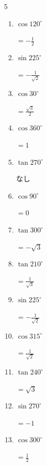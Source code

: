\begin{multicols}{5}
\begin{enumerate}
        $\displaystyle =0$

  \item $\displaystyle \cos{120^\circ}$

        $\displaystyle =-\frac{1}{2}$

  \item $\displaystyle \sin{225^\circ}$

        $\displaystyle =-\frac{1}{\sqrt{2}}$

  \item $\displaystyle \cos{30^\circ}$

        $\displaystyle =\frac{\sqrt{3}}{2}$

  \item $\displaystyle \cos{360^\circ}$

        $\displaystyle =1$

  \item $\displaystyle \tan{270^\circ}$

        $\displaystyle なし$

  \item $\displaystyle \cos{90^\circ}$

        $\displaystyle =0$

  \item $\displaystyle \tan{300^\circ}$

        $\displaystyle =-\sqrt{3}$

  \item $\displaystyle \tan{210^\circ}$

        $\displaystyle =\frac{1}{\sqrt{3}}$

  \item $\displaystyle \sin{225^\circ}$

        $\displaystyle =-\frac{1}{\sqrt{2}}$

  \item $\displaystyle \cos{315^\circ}$

        $\displaystyle =\frac{1}{\sqrt{2}}$

  \item $\displaystyle \tan{240^\circ}$

        $\displaystyle =\sqrt{3}$

  \item $\displaystyle \sin{270^\circ}$

        $\displaystyle =-1$

  \item $\displaystyle \cos{300^\circ}$

        $\displaystyle =\frac{1}{2}$


\end{enumerate}
\end{multicols}
